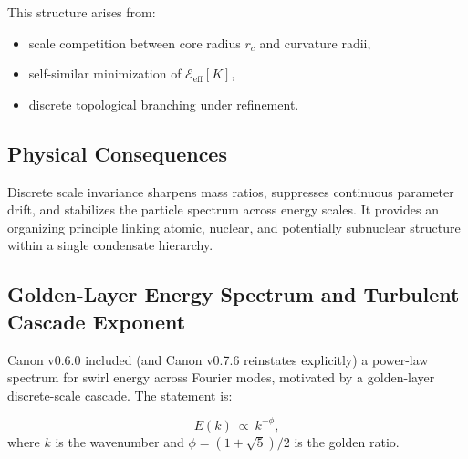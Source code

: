 \documentclass[10pt]{article}
\begin{document}
This structure arises from:
\begin{itemize}
    \item scale competition between core radius $r_c$ and curvature radii,
    \item self-similar minimization of $\mathcal{E}_{\mathrm{eff}}[K]$,
    \item discrete topological branching under refinement.
\end{itemize}

\subsection{Physical Consequences}

Discrete scale invariance sharpens mass ratios, suppresses continuous
parameter drift, and stabilizes the particle spectrum across energy scales.
It provides an organizing principle linking atomic, nuclear, and potentially
subnuclear structure within a single condensate hierarchy.

    

\subsection{Golden-Layer Energy Spectrum and Turbulent Cascade Exponent}
\label{sec:golden_spectrum}

Canon v0.6.0 included (and Canon v0.7.6 reinstates explicitly) a
power-law spectrum for swirl energy across Fourier modes, motivated by
a golden-layer discrete-scale cascade. The statement is:

\begin{equation}
    E(k)\ \propto\ k^{-\phi},
    \label{eq:Ek_phi}
\end{equation}
where $k$ is the wavenumber and $\phi=(1+\sqrt{5})/2$ is the golden ratio.
\end{document}
